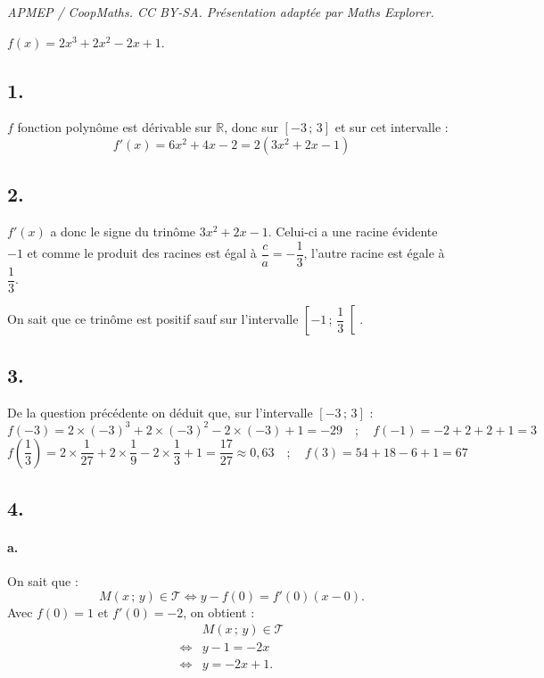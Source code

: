 \documentclass[10pt]{article}
\begin{document}
\noindent\textit{APMEP / CoopMaths. CC BY-SA. Présentation adaptée par Maths Explorer.}\par\medskip
\(f(x) = 2x^3 + 2x^2 - 2x + 1\).

\subsection*{1.}

\(f\) fonction polynôme est dérivable sur \(\mathbb{R}\), donc sur \([-3\,;\,3]\) et sur cet intervalle :
\[
f'(x) = 6x^2 + 4x - 2 = 2(3x^2 + 2x - 1)
\]

\subsection*{2.}

\(f'(x)\) a donc le signe du trinôme \(3x^2 + 2x - 1\). Celui-ci a une racine évidente \(-1\) et comme le produit des racines est égal à \(\dfrac{c}{a} = -\dfrac{1}{3}\), l'autre racine est égale à \(\dfrac{1}{3}\).

On sait que ce trinôme est positif sauf sur l'intervalle \(\left[-1\,;\,\dfrac{1}{3}\right[\).

\subsection*{3.}

De la question précédente on déduit que, sur l'intervalle \([-3\,;\,3]\) :
\[f(-3) = 2 \times (-3)^3 + 2 \times (-3)^2 - 2 \times (-3) + 1 = -29 \quad ; \quad f(-1) = -2 + 2 + 2 + 1 = 3\]
\[f\left(\dfrac{1}{3}\right) = 2 \times \dfrac{1}{27} + 2 \times \dfrac{1}{9} - 2 \times \dfrac{1}{3} + 1 = \dfrac{17}{27} \approx 0{,}63 \quad ; \quad f(3) = 54 + 18 - 6 + 1 = 67\]
\begin{center}
\end{center}

\subsection*{4.}

\paragraph{a.} On sait que :
\[
M(x\,;\,y) \in \mathcal{T} \iff y - f(0) = f'(0)(x - 0).
\]
Avec \(f(0) = 1\) et \(f'(0) = -2\), on obtient :
\begin{align*}
&M(x\,;\,y) \in \mathcal{T} \\
\iff &y - 1 = -2x \\
\iff &y = -2x + 1.
\end{align*}
\end{document}

